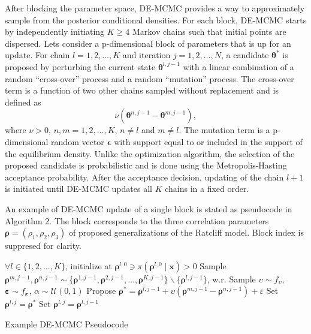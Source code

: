 \documentclass[12pt]{report}
\begin{document}
After blocking the parameter space, DE-MCMC provides a way to approximately sample from the posterior conditional densities. For each block, DE-MCMC starts by independently initiating $K \geq 4$ Markov chains such that initial points are dispersed. Lets consider a p-dimensional block of parameters that is up for an update. For chain $l = 1, 2, \ldots, K$ and iteration $j = 1, 2, \ldots, N$, a candidate $\boldsymbol{\theta}^{*}$ is proposed by perturbing the current state $\boldsymbol{\theta}^{l,j-1}$ with a linear combination of a random ``cross-over'' process and a random ``mutation'' process. The cross-over term is a function of two other chains sampled without replacement and is defined as
\begin{equation}
\nu(\boldsymbol{\theta}^{n,j-1} - \boldsymbol{\theta}^{m,j-1}),
\end{equation}
where $\nu > 0$, $n, m = 1, 2, \ldots, K$, $n \neq l$ and $m \neq l$. The mutation term is a p-dimensional random vector $\boldsymbol{\epsilon}$ with support equal to or included in the support of the equilibrium density. Unlike the optimization algorithm, the selection of the proposed candidate is probabilistic and is done using the Metropolis-Hasting acceptance probability. After the acceptance decision, updating of the chain $l+1$ is initiated until DE-MCMC updates all $K$ chains in a fixed order. 

An example of DE-MCMC update of a single block is stated as pseudocode in Algorithm 2. The block corresponds to the three correlation parameters $\boldsymbol{\rho} = (\rho_1,\rho_2,\rho_3)$ of proposed generalizations of the Ratcliff model. Block index is suppresed for clarity.
%
\begin{algorithm}
\centering
\begin{algorithmic}
\Require $\forall l \in \{1, 2, \dots, K\}$, initialize at $\boldsymbol{\rho}^{l, 0} \ni \pi(\boldsymbol{\rho}^{l, 0} \mid \boldsymbol{x}) > 0$
		\State Sample $\boldsymbol{\rho}^{m, j-1}, 	 		               \boldsymbol{\rho}^{n, j-1} \sim          	               \{\boldsymbol{\rho}^{1, j-1},        	 	 	            \boldsymbol{\rho}^{2, j-1}, \dots,              	           \boldsymbol{\rho}^{K, j-1}\} \backslash 	 	 	 		    \{\boldsymbol{\rho}^{l, j-1}\}$, w.r.
        \State Sample $\upsilon \sim f_{\upsilon}$,      	 	            $\boldsymbol{\varepsilon} \sim 								   f_{\boldsymbol{\varepsilon}}$, $\alpha    	 	            \sim \mathcal{U}(0, 1)$
		\State Propose $\boldsymbol{\rho}^* = 	 	 	 	 		    	\boldsymbol{\rho}^{l, j-1} + 								   \upsilon(\boldsymbol{\rho}^{m, j - 1} - 				       \boldsymbol{\rho}^{n, j - 1}) + \varepsilon$
				\State Set $\boldsymbol{\rho}^{l, j} = 							   \boldsymbol{\rho}^*$
        \Else 
				\State Set $\boldsymbol{\rho}^{l, j} = 							   \boldsymbol{\rho}^{l, j-1}$
		\EndIf
	\EndFor
\EndFor 
\caption{\label{fig:de} Example DE-MCMC Pseudocode}
\end{algorithmic}
\end{algorithm}
%
\end{document}
